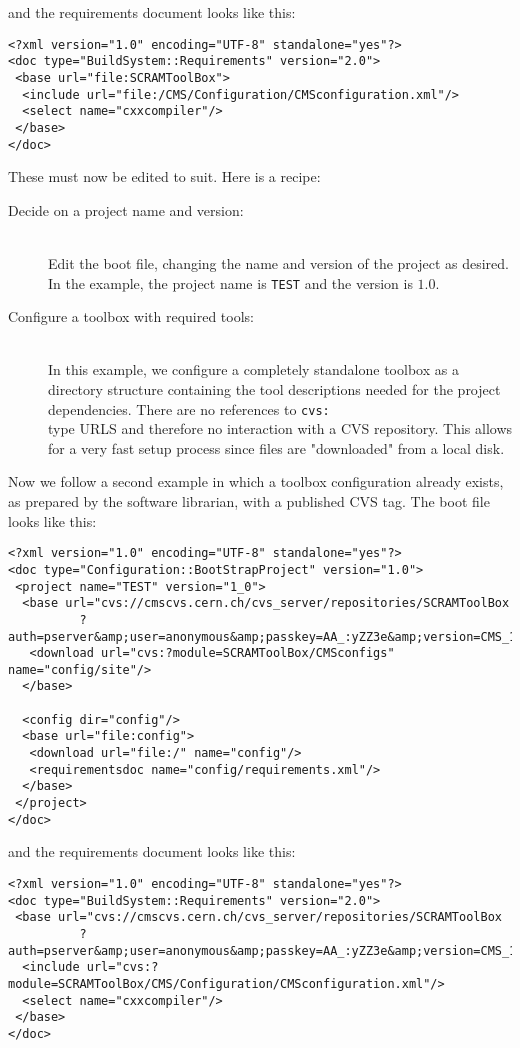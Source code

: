 \ni and the requirements document looks like this:
\small{
\begin{verbatim}
<?xml version="1.0" encoding="UTF-8" standalone="yes"?>
<doc type="BuildSystem::Requirements" version="2.0">
 <base url="file:SCRAMToolBox">
  <include url="file:/CMS/Configuration/CMSconfiguration.xml"/>
  <select name="cxxcompiler"/>
 </base>
</doc>
\end{verbatim}}\normalsize

\ni These must now be edited to suit. Here is a recipe:

\begin{description}
\item[Decide on a project name and version:]\mbox{}\\
Edit the boot file, changing the name and version of the project as
desired. In the example, the project name is \texttt{TEST} and the
version is $1.0$.
\item[Configure a toolbox with required tools:]\mbox{}\\
In this example, we configure a completely standalone toolbox as a
directory structure containing the tool descriptions needed for the
project dependencies. There are no references to \texttt{cvs:\\} type
URLS and therefore no interaction with a CVS repository.
This allows for a very fast setup process since files are
"downloaded" from a local disk.
\end{description}

\ni Now we follow a second example in which a toolbox configuration
already exists, as prepared by the software librarian, with a
published CVS tag. The boot file looks like this:
\small{
\begin{verbatim}
<?xml version="1.0" encoding="UTF-8" standalone="yes"?>
<doc type="Configuration::BootStrapProject" version="1.0">
 <project name="TEST" version="1_0">
  <base url="cvs://cmscvs.cern.ch/cvs_server/repositories/SCRAMToolBox
          ?auth=pserver&amp;user=anonymous&amp;passkey=AA_:yZZ3e&amp;version=CMS_145a_2">
   <download url="cvs:?module=SCRAMToolBox/CMSconfigs" name="config/site"/>
  </base>

  <config dir="config"/>
  <base url="file:config">
   <download url="file:/" name="config"/>
   <requirementsdoc name="config/requirements.xml"/>
  </base>
 </project>
</doc>
\end{verbatim}}\normalsize

\ni and the requirements document looks like this:
\small{
\begin{verbatim}
<?xml version="1.0" encoding="UTF-8" standalone="yes"?>
<doc type="BuildSystem::Requirements" version="2.0">
 <base url="cvs://cmscvs.cern.ch/cvs_server/repositories/SCRAMToolBox
          ?auth=pserver&amp;user=anonymous&amp;passkey=AA_:yZZ3e&amp;version=CMS_145a_2">
  <include url="cvs:?module=SCRAMToolBox/CMS/Configuration/CMSconfiguration.xml"/>
  <select name="cxxcompiler"/>
 </base>
</doc>
\end{verbatim}}\normalsize

